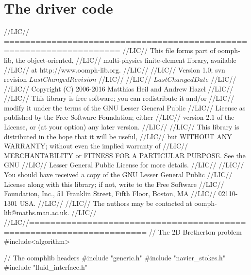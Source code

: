  

\hypertarget{index_driver}{}\section{The driver code}\label{index_driver}

\begin{DoxyCodeInclude}
\textcolor{comment}{//LIC// ====================================================================}
\textcolor{comment}{//LIC// This file forms part of oomph-lib, the object-oriented, }
\textcolor{comment}{//LIC// multi-physics finite-element library, available }
\textcolor{comment}{//LIC// at http://www.oomph-lib.org.}
\textcolor{comment}{//LIC// }
\textcolor{comment}{//LIC//    Version 1.0; svn revision $LastChangedRevision$}
\textcolor{comment}{//LIC//}
\textcolor{comment}{//LIC// $LastChangedDate$}
\textcolor{comment}{//LIC// }
\textcolor{comment}{//LIC// Copyright (C) 2006-2016 Matthias Heil and Andrew Hazel}
\textcolor{comment}{//LIC// }
\textcolor{comment}{//LIC// This library is free software; you can redistribute it and/or}
\textcolor{comment}{//LIC// modify it under the terms of the GNU Lesser General Public}
\textcolor{comment}{//LIC// License as published by the Free Software Foundation; either}
\textcolor{comment}{//LIC// version 2.1 of the License, or (at your option) any later version.}
\textcolor{comment}{//LIC// }
\textcolor{comment}{//LIC// This library is distributed in the hope that it will be useful,}
\textcolor{comment}{//LIC// but WITHOUT ANY WARRANTY; without even the implied warranty of}
\textcolor{comment}{//LIC// MERCHANTABILITY or FITNESS FOR A PARTICULAR PURPOSE.  See the GNU}
\textcolor{comment}{//LIC// Lesser General Public License for more details.}
\textcolor{comment}{//LIC// }
\textcolor{comment}{//LIC// You should have received a copy of the GNU Lesser General Public}
\textcolor{comment}{//LIC// License along with this library; if not, write to the Free Software}
\textcolor{comment}{//LIC// Foundation, Inc., 51 Franklin Street, Fifth Floor, Boston, MA}
\textcolor{comment}{//LIC// 02110-1301  USA.}
\textcolor{comment}{//LIC// }
\textcolor{comment}{//LIC// The authors may be contacted at oomph-lib@maths.man.ac.uk.}
\textcolor{comment}{//LIC// }
\textcolor{comment}{//LIC//====================================================================}
\textcolor{comment}{// The 2D Bretherton problem}
\textcolor{preprocessor}{#include<algorithm>}
 
\textcolor{comment}{// The oomphlib headers   }
\textcolor{preprocessor}{#include "generic.h"}
\textcolor{preprocessor}{#include "navier\_stokes.h"}
\textcolor{preprocessor}{#include "fluid\_interface.h"}


\end{DoxyCodeInclude}
